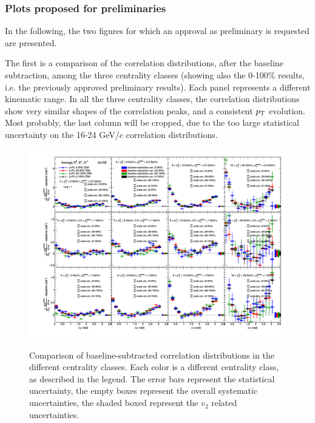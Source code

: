 \subsubsection{Plots proposed for preliminaries}
In the following, the two figures for which an approval as preliminary is requested are presented.

The first is a comparison of the correlation distributions, after the baseline subtraction, among the three centrality classes (showing also the 0-100\% results, i.e. the previously approved preliminary results). Each panel represents a different kinematic range. In all the three centrality classes, the correlation distributions show very similar shapes of the correlation peaks, and a consistent $p_{\rm T}$ evolution. Most probably, the last column will be cropped, due to the too large statistical uncertainty on the 16-24 GeV/$c$ correlation distributions.

\begin{landscape}
\begin{figure}
\centering
{\includegraphics[width=0.9\linewidth]{figuresVsCent/Averages/Trends/plotComparison_WeightedAverage_pp_pPb_UniqueCanvas_Style1.png}}
 \caption{Comparison of baseline-subtracted correlation distributions in the different centrality classes. Each color is a different centrality class, as described in the legend. The error bars represent the statistical uncertainty, the empty boxes represent the overall systematic uncertainties, the shaded boxed represent the $v_2$ related uncertainties.}
\label{fig:prel1}
\end{figure}
\end{landscape}

